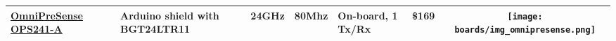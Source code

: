 \begin{longtable}[]{@{}llllllc@{}}
\begin{minipage}[t]{\colwidthA}\raggedright\strut
	\href{https://www.omnipresense.com/product/ops241-a/}{OmniPreSense OPS241-A}
\strut\end{minipage} &
\begin{minipage}[t]{\colwidthB}\raggedright\strut
Arduino shield with BGT24LTR11
\strut\end{minipage} &
\begin{minipage}[t]{\colwidthC}\raggedright\strut
24GHz
\strut\end{minipage} &
\begin{minipage}[t]{\colwidthD}\raggedright\strut
80Mhz
\strut\end{minipage} &
\begin{minipage}[t]{\colwidthE}\raggedright\strut
On-board, 1 Tx/Rx
\strut\end{minipage} &
\begin{minipage}[t]{\colwidthF}\raggedright\strut
\$169
\strut\end{minipage} &
\begin{minipage}[t]{\colwidthG}\centering\strut
\texttt{[image: boards/img\_omnipresense.png]}
\strut\end{minipage}\tabularnewline

\bottomrule
\end{longtable}
